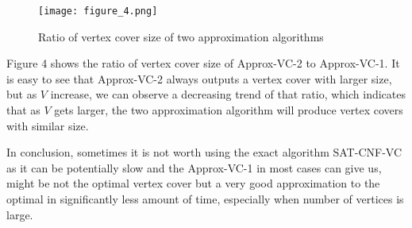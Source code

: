 \documentclass[letterpaper,12pt,titlepage,oneside,final]{book}
\begin{document}
\begin{figure}[h!]
    \centering
    \texttt{[image: figure\_4.png]}
    \caption{Ratio of vertex cover size of two approximation algorithms}
\end{figure}

Figure 4 shows the ratio of vertex cover size of Approx-VC-2 to Approx-VC-1. It is easy to see that Approx-VC-2 always outputs a vertex cover with larger size, but as $V$ increase, we can observe a decreasing trend of that ratio, which indicates that as $V$ gets larger, the two approximation algorithm will produce vertex covers with similar size. 

In conclusion, sometimes it is not worth using the exact algorithm SAT-CNF-VC as it can be potentially slow and the Approx-VC-1 in most cases can give us, might be not the optimal vertex cover but a very good approximation to the optimal in significantly less amount of time, especially when number of vertices is large.  
\end{document}

